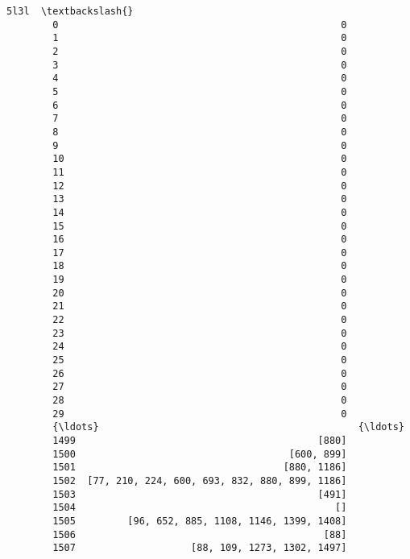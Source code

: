 \documentclass[11pt]{article}
\begin{document}
\begin{Verbatim}[commandchars=\\\{\}]
                                                       5l3l  \textbackslash{}
        0                                                 0   
        1                                                 0   
        2                                                 0   
        3                                                 0   
        4                                                 0   
        5                                                 0   
        6                                                 0   
        7                                                 0   
        8                                                 0   
        9                                                 0   
        10                                                0   
        11                                                0   
        12                                                0   
        13                                                0   
        14                                                0   
        15                                                0   
        16                                                0   
        17                                                0   
        18                                                0   
        19                                                0   
        20                                                0   
        21                                                0   
        22                                                0   
        23                                                0   
        24                                                0   
        25                                                0   
        26                                                0   
        27                                                0   
        28                                                0   
        29                                                0   
        {\ldots}                                             {\ldots}   
        1499                                          [880]   
        1500                                     [600, 899]   
        1501                                    [880, 1186]   
        1502  [77, 210, 224, 600, 693, 832, 880, 899, 1186]   
        1503                                          [491]   
        1504                                             []   
        1505         [96, 652, 885, 1108, 1146, 1399, 1408]   
        1506                                           [88]   
        1507                    [88, 109, 1273, 1302, 1497]   

\end{Verbatim}
\end{document}
